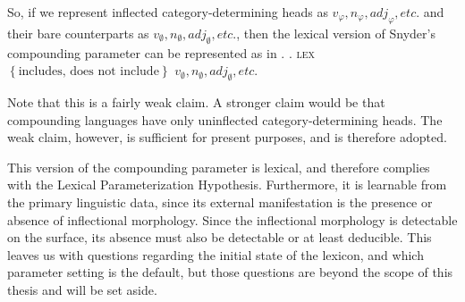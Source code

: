 \documentclass[MilwayThesis]{subfiles}
\begin{document}
So, if we represent inflected category-determining heads as $v_\varphi, n_\varphi, adj_\varphi, etc.$ and their bare counterparts as $v_\emptyset, n_\emptyset, adj_\emptyset, etc.$, then the lexical version of Snyder's compounding parameter can be represented as in \Next.
\ex. \textsc{lex} $\left\{ \text{includes, does not include} \right\}$ $v_\emptyset, n_\emptyset, adj_\emptyset, etc.$

Note that this is a fairly weak claim.
A stronger claim would be that compounding languages have only uninflected category-determining heads.
The weak claim, however, is sufficient for present purposes, and is therefore adopted.

This version of the compounding parameter is lexical, and therefore complies with the Lexical Parameterization Hypothesis.
Furthermore, it is learnable from the primary linguistic data, since its external manifestation is the presence or absence of inflectional morphology.
Since the inflectional morphology is detectable on the surface, its absence must also be detectable or at least deducible.
This leaves us with questions regarding the initial state of the lexicon, and which parameter setting is the default, but those questions are beyond the scope of this thesis and will be set aside.
\end{document}
